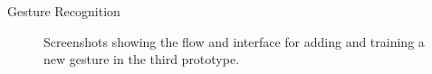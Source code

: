 \begin{frame}{Gesture Recognition}{}
\centering
\begin{figure}
    \caption{Screenshots showing the flow and interface for adding and training a new gesture in the third prototype.}
\label{fig:prototype3-gesture-screenshots}
\end{figure}
\end{frame}

